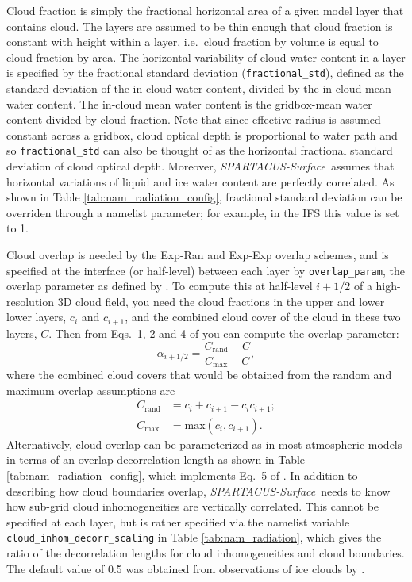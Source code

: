 \documentclass[a4,oneside]{article}
\def\codesize{\small}
\def\spsurf{\emph{SPARTACUS-Surface}}
\def\code#1{{\codesize\texttt{#1}}}
\begin{document}
Cloud fraction is simply the fractional horizontal area of a given
model layer that contains cloud.  The layers are assumed to be thin
enough that cloud fraction is constant with height within a layer,
i.e.\ cloud fraction by volume is equal to cloud fraction by area. The
horizontal variability of cloud water content in a layer is specified
by the fractional standard deviation (\code{fractional\_std}), defined
as the standard deviation of the in-cloud water content, divided by
the in-cloud mean water content. The in-cloud mean water content is
the gridbox-mean water content divided by cloud fraction. Note that
since effective radius is assumed constant across a gridbox, cloud
optical depth is proportional to water path and so
\code{fractional\_std} can also be thought of as the horizontal
fractional standard deviation of cloud optical depth. Moreover,
\spsurf\ assumes that horizontal variations of liquid and ice water
content are perfectly correlated.  As shown in Table
\ref{tab:nam_radiation_config}, fractional standard deviation can be
overriden through a namelist parameter; for example, in the IFS this
value is set to 1.

Cloud overlap is needed by the Exp-Ran and Exp-Exp overlap schemes,
and is specified at the interface (or half-level) between each layer
by \code{overlap\_param}, the overlap parameter as defined by
\cite{Hogan&2000}.  To compute this at half-level $i+1/2$ of a
high-resolution 3D cloud field, you need the cloud fractions in the
upper and lower lower layers, $c_{i}$ and $c_{i+1}$, and the combined
cloud cover of the cloud in these two layers, $C$.  Then from Eqs.\ 1,
2 and 4 of \cite{Hogan&2000} you can compute the overlap parameter:
%
\begin{equation}
  \alpha_{i+1/2}=\frac{C_\mathrm{rand}-C}{C_\mathrm{max}-C},
\end{equation}
%
where the combined cloud covers that would be obtained from the random
and maximum overlap assumptions are
%
\begin{align}
  C_\mathrm{rand}&=c_i+c_{i+1}-c_ic_{i+1};\\
  C_\mathrm{max}&=\mathrm{max}(c_i,c_{i+1}).
\end{align}
%
Alternatively, cloud overlap can be parameterized as in most
atmospheric models in terms of an overlap decorrelation length as
shown in Table \ref{tab:nam_radiation_config}, which implements Eq.\ 5
of \cite{Hogan&2000}. In addition to describing how cloud boundaries
overlap, \spsurf\ needs to know how sub-grid cloud inhomogeneities are
vertically correlated. This cannot be specified at each layer, but is
rather specified via the namelist variable
\code{cloud\_inhom\_decorr\_scaling} in Table \ref{tab:nam_radiation},
which gives the ratio of the decorrelation lengths for cloud
inhomogeneities and cloud boundaries. The default value of 0.5 was
obtained from observations of ice clouds by \cite{Hogan+2003}.
\end{document}
